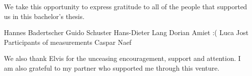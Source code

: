 \begin{acknowledgement}

We take this opportunity to express gratitude to all of the people that supported us in this bachelor's thesis.

Hannes Badertscher
Guido Schuster
Hans-Dieter Lang
Dorian Amiet :(
Luca Jost
Participants of measurements
Caspar Naef




We also thank Elvis  for the unceasing encouragement, support and attention. I am also grateful to my partner who supported me through this venture.

\end{acknowledgement}